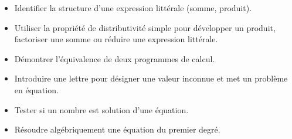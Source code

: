 \begin{prerequis}[Objectifs de 4\up{e}]    
    \begin{itemize}        
        \item Identifier la structure d’une expression littérale (somme, produit).
        \item Utiliser la propriété de distributivité simple pour développer un produit, factoriser une somme
        ou réduire une expression littérale.
        \item Démontrer l’équivalence de deux programmes de calcul.
        \columnbreak
        \item Introduire une lettre pour désigner une valeur inconnue et met un problème en équation.
        \item Tester si un nombre est solution d’une équation.
        \item Résoudre algébriquement une équation du premier degré.
    \end{itemize}
\end{prerequis}
